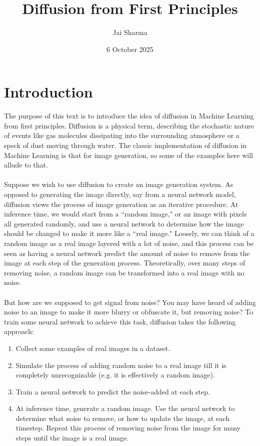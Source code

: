 \documentclass{article}
\title{Diffusion from First Principles}
\author{Jai Sharma}
\date{6 October 2025}
\begin{document}
\maketitle
\tableofcontents
\newpage

\section{Introduction}
The purpose of this text is to introduce the idea of diffusion in Machine Learning from first principles. Diffusion is a physical term, describing the stochastic nature of events like gas molecules dissipating into the surrounding atmosphere or a speck of dust moving through water. The classic implementation of diffusion in Machine Learning is that for image generation, so some of the examples here will allude to that. 
\\
\\
Suppose we wish to use diffusion to create an image generation system. As opposed to generating the image directly, say from a neural network model, diffusion views the process of image generation as an iterative procedure. At inference time, we would start from a ``random image," or an image with pixels all generated randomly, and use a neural network to determine how the image should be changed to make it more like a ``real image." Loosely, we can think of a random image as a real image layered with a lot of noise, and this process can be seen as having a neural network predict the amount of noise to remove from the image at each step of the generation process. Theoretically, over many steps of removing noise, a random image can be transformed into a real image with no noise.
\\
\\
But how are we supposed to get signal from noise? You may have heard of adding noise to an image to make it more blurry or obfuscate it, but removing noise? To train some neural network to achieve this task, diffusion takes the following approach:
\begin{enumerate}
    \item Collect some examples of real images in a dataset.
    \item Simulate the process of adding random noise to a real image till it is completely unrecognizable (e.g. it is effectively a random image).
    \item Train a neural network to predict the noise-added at each step.
    \item At inference time, generate a random image. Use the neural network to determine what noise to remove, or how to update the image, at each timestep. Repeat this process of removing noise from the image for many steps until the image is a real image.
\end{enumerate}
\end{document}
